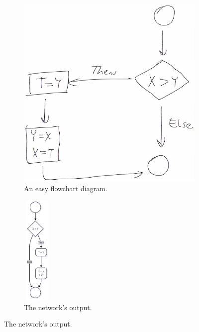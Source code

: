\documentclass[conference]{IEEEtran}
\begin{document}
\begin{figure}[htbp]
	\centering
	
	\begin{subfigure}[b]{0.45\linewidth}
		\includegraphics[width=\linewidth]{ex1.png}
		\caption{An easy flowchart diagram.}
	\end{subfigure}
	\hfill
	\begin{subfigure}[b]{0.4\linewidth}
		\includegraphics[width=40pt, height=150pt]{ex2.png}
		\caption{The network's output.}
	\end{subfigure}
	
	\vspace{1em} %
	

\end{figure}
\end{document}
